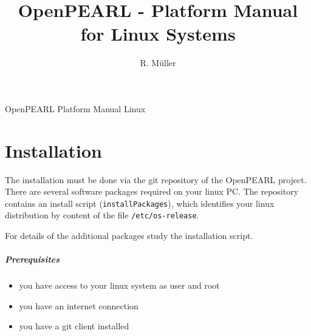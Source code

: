 \documentclass[oneside,10pt]{scrbook}
\begin{document}
\title{OpenPEARL - Platform Manual for Linux Systems}
\author{R. M\"uller}

 {
}%
{}%

 {
}%
{}%

\pagestyle{myheadings}
          {OpenPEARL Platform Manual Linux}

\maketitle

\tableofcontents

%
%
%

\chapter{Installation}
The installation must be done via the git repository of the OpenPEARL project.
There are several software packages required on your linux PC. 
The repository contains an install script (\verb|installPackages|),
which identifies your
linux distribution by content of the file \verb|/etc/os-release|.

For details of the additional packages study the installation script.

\paragraph{Prerequisites}
\begin{itemize}
\item you have access to your linux system as user and root
\item you have an internet connection
\item you have a git client installed
\end{itemize}
\end{document}
